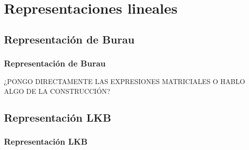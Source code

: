 \documentclass{beamer}
\theoremstyle{definition}
\begin{document}
\section{Representaciones lineales}


\subsection{Representación de Burau}
\begin{frame}
\frametitle{Representación de Burau}

¿PONGO DIRECTAMENTE LAS EXPRESIONES MATRICIALES O HABLO ALGO DE LA CONSTRUCCIÓN?
\end{frame}

\subsection{Representación LKB}
\begin{frame}
\frametitle{Representación LKB}
\end{frame}
\end{document}
